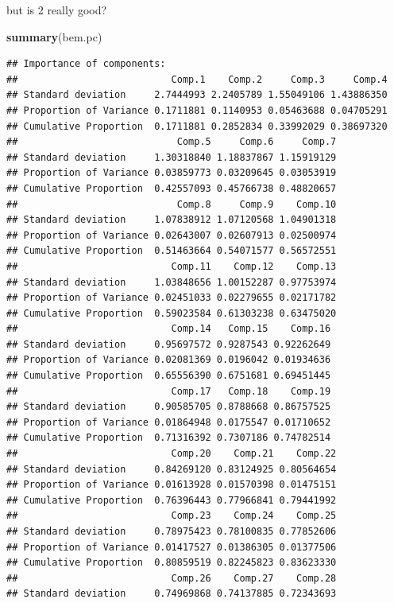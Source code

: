 \documentclass[
  ignorenonframetext,
]{beamer}
\newenvironment{Shaded}{\begin{snugshade}}{\end{snugshade}}
\newcommand{\KeywordTok}[1]{\textcolor[rgb]{0.13,0.29,0.53}{\textbf{#1}}}
\newcommand{\NormalTok}[1]{#1}
\begin{document}
\begin{frame}[fragile]{but is 2 really good?}
\protect\hypertarget{but-is-2-really-good}{}

\scriptsize

\begin{Shaded}
\begin{Highlighting}[]
\KeywordTok{summary}\NormalTok{(bem.pc)}
\end{Highlighting}
\end{Shaded}

\begin{verbatim}
## Importance of components:
##                           Comp.1    Comp.2     Comp.3     Comp.4
## Standard deviation     2.7444993 2.2405789 1.55049106 1.43886350
## Proportion of Variance 0.1711881 0.1140953 0.05463688 0.04705291
## Cumulative Proportion  0.1711881 0.2852834 0.33992029 0.38697320
##                            Comp.5     Comp.6     Comp.7
## Standard deviation     1.30318840 1.18837867 1.15919129
## Proportion of Variance 0.03859773 0.03209645 0.03053919
## Cumulative Proportion  0.42557093 0.45766738 0.48820657
##                            Comp.8     Comp.9    Comp.10
## Standard deviation     1.07838912 1.07120568 1.04901318
## Proportion of Variance 0.02643007 0.02607913 0.02500974
## Cumulative Proportion  0.51463664 0.54071577 0.56572551
##                           Comp.11    Comp.12    Comp.13
## Standard deviation     1.03848656 1.00152287 0.97753974
## Proportion of Variance 0.02451033 0.02279655 0.02171782
## Cumulative Proportion  0.59023584 0.61303238 0.63475020
##                           Comp.14   Comp.15    Comp.16
## Standard deviation     0.95697572 0.9287543 0.92262649
## Proportion of Variance 0.02081369 0.0196042 0.01934636
## Cumulative Proportion  0.65556390 0.6751681 0.69451445
##                           Comp.17   Comp.18    Comp.19
## Standard deviation     0.90585705 0.8788668 0.86757525
## Proportion of Variance 0.01864948 0.0175547 0.01710652
## Cumulative Proportion  0.71316392 0.7307186 0.74782514
##                           Comp.20    Comp.21    Comp.22
## Standard deviation     0.84269120 0.83124925 0.80564654
## Proportion of Variance 0.01613928 0.01570398 0.01475151
## Cumulative Proportion  0.76396443 0.77966841 0.79441992
##                           Comp.23    Comp.24    Comp.25
## Standard deviation     0.78975423 0.78100835 0.77852606
## Proportion of Variance 0.01417527 0.01386305 0.01377506
## Cumulative Proportion  0.80859519 0.82245823 0.83623330
##                           Comp.26    Comp.27    Comp.28
## Standard deviation     0.74969868 0.74137885 0.72343693

\end{verbatim}
\end{frame}
\end{document}
